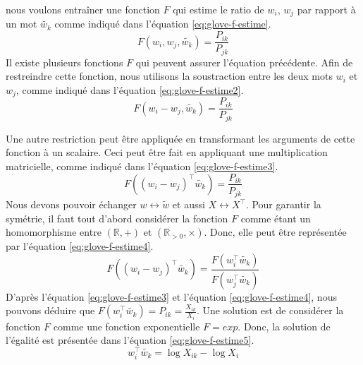 \documentclass{KodeBook}
\begin{document}
nous voulons entraîner une fonction $F$ qui estime le ratio de $w_i$, $w_j$ par rapport à un mot $\tilde{w_k}$ comme indiqué dans l'équation \ref{eq:glove-f-estime}.
\begin{equation}
F(w_i, w_j, \tilde{w_k}) = \frac{P_{ik}}{P_{jk}}
\label{eq:glove-f-estime}
\end{equation}
Il existe plusieurs fonctions $F$ qui peuvent assurer l'équation précédente. 
Afin de restreindre cette fonction, nous utilisons la soustraction entre les deux mots $w_i$ et $w_j$, comme indiqué dans l'équation \ref{eq:glove-f-estime2}.
\begin{equation}
F(w_i - w_j, \tilde{w_k}) = \frac{P_{ik}}{P_{jk}}
\label{eq:glove-f-estime2}
\end{equation}

Une autre restriction peut être appliquée en transformant les arguments de cette fonction à un scalaire.
Ceci peut être fait en appliquant une multiplication matricielle, comme indiqué dans l'équation \ref{eq:glove-f-estime3}.
\begin{equation}
F((w_i - w_j)^\top \tilde{w_k}) = \frac{P_{ik}}{P_{jk}}
\label{eq:glove-f-estime3}
\end{equation}
Nous devons pouvoir échanger $w \leftrightarrow \tilde{w}$ et aussi $X \leftrightarrow X^\top$. 
Pour garantir la symétrie, il faut tout d'abord considérer la fonction $F$ comme étant un homomorphisme entre $(\mathbb{R}, +)$ et $(\mathbb{R}_{>0}, \times)$.
Donc, elle peut être représentée par l'équation \ref{eq:glove-f-estime4}. 
\begin{equation}
F((w_i - w_j)^\top \tilde{w_k}) = \frac{F(w_i^\top \tilde{w_k})}{F(w_j^\top \tilde{w_k})}
\label{eq:glove-f-estime4}
\end{equation}
D'après l'équation \ref{eq:glove-f-estime3} et l'équation \ref{eq:glove-f-estime4}, nous pouvons déduire que $F(w_i^\top \tilde{w_k}) = P_{ik} = \frac{X_{ik}}{X_i}$. 
Une solution est de considérer la fonction $F$ comme une fonction exponentielle $F=exp$. 
Donc, la solution de l'égalité est présentée dans l'équation \ref{eq:glove-f-estime5}.
\begin{equation}
w_i^\top \tilde{w_k} = \log X_{ik} - \log X_i
\label{eq:glove-f-estime5}
\end{equation}
\end{document}
